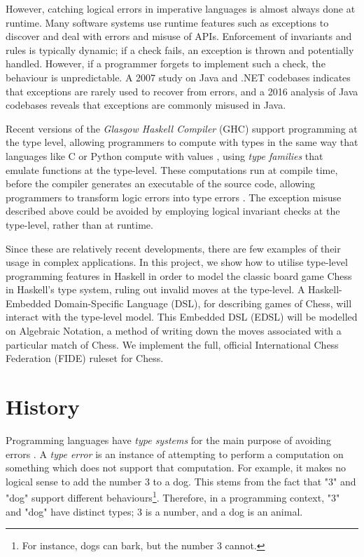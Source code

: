 \documentclass[12pt, a4paper, bibliography=totocnumbered]{scrreprt}
\begin{document}
However, catching logical errors in imperative languages is almost always done at runtime. Many software systems use runtime features such as exceptions to discover and deal with errors and misuse of APIs. Enforcement of invariants and rules is typically dynamic; if a check fails, an exception is thrown and potentially handled. However, if a programmer forgets to implement such a check, the behaviour is unpredictable. A 2007 study \cite{exceptionsusedpoorly} on Java and .NET codebases indicates that exceptions are rarely used to recover from errors, and a 2016 analysis of Java codebases \cite{badjavaexceptions} reveals that exceptions are commonly misused in Java.

Recent versions of the \emph{Glasgow Haskell Compiler} (GHC) support programming at the type level, allowing programmers to compute with types in the same way that languages like C or Python compute with values \cite{yorgey2012giving}, using \emph{type families} \cite{opentfs} \cite{closedtfs} that emulate functions at the type-level. These computations run at compile time, before the compiler generates an executable of the source code, allowing programmers to transform logic errors into type errors \cite{twt}. The exception misuse described above could be avoided by employing logical invariant checks at the type-level, rather than at runtime.

Since these are relatively recent developments, there are few examples of their usage in complex applications. In this project, we show how to utilise type-level programming features in Haskell in order to model the classic board game Chess in Haskell's type system, ruling out invalid moves at the type-level. A Haskell-Embedded Domain-Specific Language (DSL), for describing games of Chess, will interact with the type-level model. This Embedded DSL (EDSL) will be modelled on Algebraic Notation, a method of writing down the moves associated with a particular match of Chess. We implement the full, official International Chess Federation (FIDE) ruleset for Chess.

\chapter{History}

Programming languages have \emph{type systems} for the main purpose of avoiding errors \cite{cardellitypes}. A \emph{type error} is an instance of attempting to perform a computation on something which does not support that computation. For example, it makes no logical sense to add the number 3 to a dog. This stems from the fact that "3" and "dog" support different behaviours\footnote{For instance, dogs can bark, but the number 3 cannot.}. Therefore, in a programming context, "3" and "dog" have distinct types; 3 is a number, and a dog is an animal.
\end{document}
